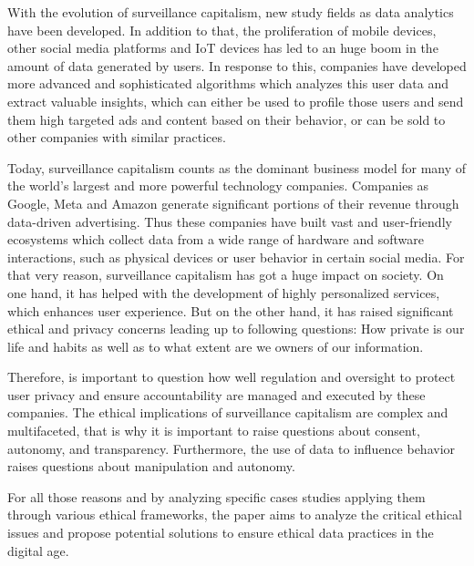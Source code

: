 With the evolution of surveillance capitalism, new study fields as data analytics have been developed.
In addition to that, the proliferation of mobile devices, other social media platforms and IoT devices has led to an huge boom in the amount of data generated by users.
In response to this, companies have developed more advanced and sophisticated algorithms which analyzes this user data and extract valuable insights, which can either be used to profile those users and send them high targeted ads and content based on their behavior, or can be sold to other companies with similar practices.

Today, surveillance capitalism counts as the dominant business model for many of the world's largest and more powerful technology companies.
Companies as Google, Meta and Amazon generate significant portions of their revenue through data-driven advertising.
Thus these companies have built vast and user-friendly ecosystems which collect data from a wide range of hardware and software interactions, such as physical devices or user behavior in certain social media.
For that very reason, surveillance capitalism has got a huge impact on society.
On one hand, it has helped with the development of highly personalized services, which enhances user experience.
But on the other hand, it has raised significant ethical and privacy concerns leading up to following questions: How private is our life and habits as well as to what extent are we owners of our information.

Therefore, is important to question how well regulation and oversight to protect user privacy and ensure accountability are managed and executed by these companies.
The ethical implications of surveillance capitalism are complex and multifaceted, that is why it is important to raise questions about consent, autonomy, and transparency.
Furthermore, the use of data to influence behavior raises questions about manipulation and autonomy.

For all those reasons and by analyzing specific cases studies applying them through various ethical frameworks, the paper aims to analyze the critical ethical issues and propose potential solutions to ensure ethical data practices in the digital age.
\noindent
